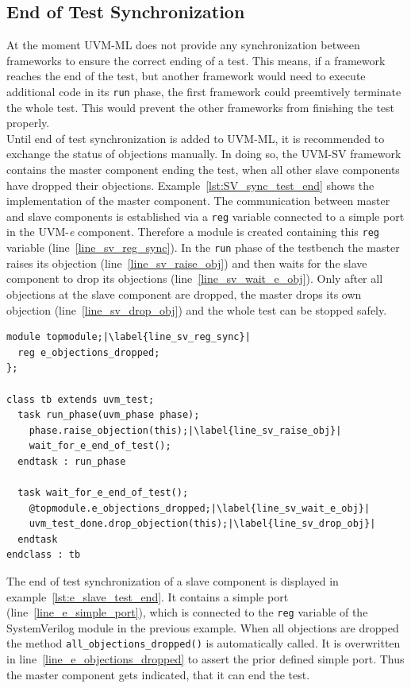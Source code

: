 \subsection{End of Test Synchronization}
At the moment UVM-ML does not provide any synchronization between frameworks to ensure the correct ending of a test. This means, if a framework reaches the end of the test, but another framework would need to execute additional code in its \lstinline$run$ phase, the first framework could preemtively terminate the whole test. This would prevent the other frameworks from finishing the test properly.\\
Until end of test synchronization is added to UVM-ML, it is recommended to exchange the status of objections manually. In doing so, the UVM-SV framework contains the master component ending the test, when all other slave components have dropped their objections. Example~\ref{lst:SV_sync_test_end} shows the implementation of the master component. The communication between master and slave components is established via a \lstinline$reg$ variable connected to a simple port in the UVM-\textit{e} component. Therefore a module is created containing this \lstinline$reg$ variable (line~\ref{line_sv_reg_sync}). In the \lstinline$run$ phase of the testbench the master raises its objection (line~\ref{line_sv_raise_obj}) and then waits for the slave component to drop its objections (line~\ref{line_sv_wait_e_obj}). Only after all objections at the slave component are dropped, the master drops its own objection (line~\ref{line_sv_drop_obj}) and the whole test can be stopped safely.
\lstset{language=SystemVerilog, numbers = left, escapechar=|, breaklines=true}
\begin{lstlisting}[frame=htrbl, caption={SystemVerilog: ending the test when UVM-\textit{e} components are ready},
label={lst:SV_sync_test_end}]
module topmodule;|\label{line_sv_reg_sync}|
  reg e_objections_dropped;
};

class tb extends uvm_test;
  task run_phase(uvm_phase phase);
    phase.raise_objection(this);|\label{line_sv_raise_obj}|
    wait_for_e_end_of_test();
  endtask : run_phase
  
  task wait_for_e_end_of_test();
    @topmodule.e_objections_dropped;|\label{line_sv_wait_e_obj}|
    uvm_test_done.drop_objection(this);|\label{line_sv_drop_obj}|
  endtask
endclass : tb
\end{lstlisting}
The end of test synchronization of a slave component is displayed in example~\ref{lst:e_slave_test_end}. It contains a simple port (line~\ref{line_e_simple_port}), which is connected to the \lstinline$reg$ variable of the SystemVerilog module in the previous example. When all objections are dropped the method \lstinline$all_objections_dropped()$ is automatically called. It is overwritten in line~\ref{line_e_objections_dropped} to assert the prior defined simple port. Thus the master component gets indicated, that it can end the test.
